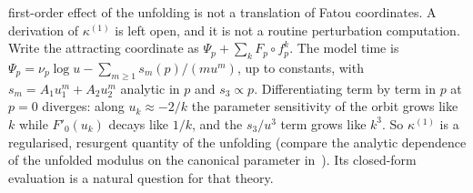 \documentclass[11pt,a4paper]{article}
\theoremstyle{definition}
\begin{document}
first-order effect of the unfolding is not a translation of Fatou coordinates.
A derivation of $\kappa^{(1)}$ is left open, and it is not a routine
perturbation computation.  Write the attracting coordinate as
$\Psi_p+\sum_kF_p\circ f_p^k$.  The model time is
$\Psi_p=\nu_p\log u-\sum_{m\ge1}s_m(p)/(mu^m)$, up to constants, with
$s_m=A_1u_1^m+A_2u_2^m$ analytic in $p$ and $s_3\propto p$.  Differentiating
term by term in $p$ at $p=0$ diverges: along $u_k\approx-2/k$ the parameter
sensitivity of the orbit grows like $k$ while $F'_0(u_k)$ decays like $1/k$,
and the $s_3/u^3$ term grows like $k^3$.  So $\kappa^{(1)}$ is a regularised,
resurgent quantity of the unfolding (compare the analytic dependence of the
unfolded modulus on the canonical parameter in~\cite{MRR2004,ChristopherRousseau}).
Its closed-form evaluation is a natural question for that theory.
\end{document}
